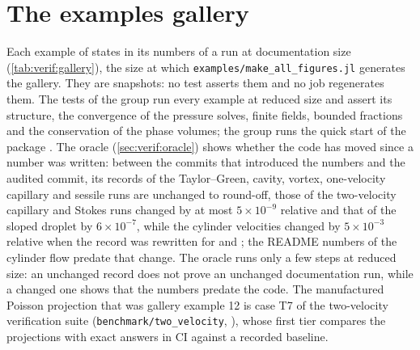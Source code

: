 \section{The examples gallery}\label{sec:verif:gallery}
Each example of  states in its  numbers of a
run at documentation size (\cref{tab:verif:gallery}), the size at which
\nolinkurl{examples/make_all_figures.jl} generates the gallery. They are
snapshots: no test asserts them and no job regenerates them. The tests of the
group  run every example at reduced size and assert its
structure, the convergence of the pressure solves, finite fields, bounded
fractions and the conservation of the phase volumes; the group
 runs the quick start of the package .
The oracle (\cref{sec:verif:oracle}) shows whether the code has moved since
a number was written: between the commits that introduced the numbers and the
audited commit, its records of the Taylor--Green, cavity, vortex,
one-velocity capillary and sessile runs are unchanged to round-off, those of
the two-velocity capillary and Stokes runs changed by at most
$5\times10^{-9}$ relative and that of the sloped droplet by
$6\times10^{-7}$, while the cylinder velocities changed by $5\times10^{-3}$
relative when the record was rewritten for  and ; the
README numbers of the cylinder flow predate that change. The oracle runs only
a few steps at reduced size: an unchanged record does not prove an unchanged
documentation run, while a changed one shows that the numbers predate the
code.
The manufactured Poisson projection that was gallery example 12 is case T7 of
the two-velocity verification suite (\nolinkurl{benchmark/two_velocity},
), whose first
tier compares the projections with exact answers in CI against a recorded
baseline.

